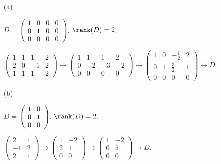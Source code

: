 \begin{Exercise}
\begin{enumerate}[(a)]
\item[(a)]
\begin{answer}
$D = \begin{pmatrix}
1 & 0 & 0 & 0 \\
0 & 1 & 0 & 0 \\
0 & 0 & 0 & 0
\end{pmatrix}$. $\rank(D) = 2$.
\end{answer}
\begin{solution}
$\begin{pmatrix}
1 & 1 & 1 & 2 \\
2 & 0 & -1 & 2 \\
1 & 1 & 1 & 2
\end{pmatrix} \longrightarrow \begin{pmatrix}
1 & 1 & 1 & 2 \\
0 & -2 & -3 & -2 \\
0 & 0 & 0 & 0
\end{pmatrix} \longrightarrow \begin{pmatrix}
1 & 0 & -\frac{1}{2} & 2 \\
0 & 1 & \frac{3}{2} & 1 \\
0 & 0 & 0 & 0
\end{pmatrix} \longrightarrow D$.
\end{solution}

\item[(b)]
\begin{answer}
$D = \begin{pmatrix}
1 & 0 \\
0 & 1 \\
0 & 0
\end{pmatrix}$. $\rank(D) = 2$.
\end{answer}
\begin{solution}
$\begin{pmatrix}
2 & 1 \\
-1 & 2 \\
2 & 1
\end{pmatrix}  \longrightarrow \begin{pmatrix}
1 & -2 \\
2 & 1 \\
0 & 0
\end{pmatrix} \longrightarrow \begin{pmatrix}
1 & -2 \\
0 & 5 \\
0 & 0
\end{pmatrix} \longrightarrow D$.
\end{solution}

\end{enumerate}
\end{Exercise}